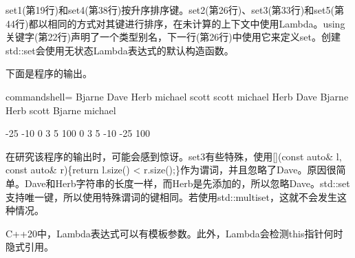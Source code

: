 set1(第19行)和set4(第38行)按升序排序键。set2(第26行)、set3(第33行)和set5(第44行)都以相同的方式对其键进行排序，在未计算的上下文中使用Lambda。using关键字(第22行)声明了一个类型别名，下一行(第26行)中使用它来定义set。创建std::set会使用无状态Lambda表达式的默认构造函数。

下面是程序的输出。

\begin{tcblisting}{commandshell={}}
Bjarne Dave Herb michael scott
scott michael Herb Dave Bjarne
Herb scott Bjarne michael

-25 -10 0 3 5 100
0 3 5 -10 -25 100
\end{tcblisting}

在研究该程序的输出时，可能会感到惊讶。set3有些特殊，使用[](const auto\& l, const auto\& r)\{return l.size() < r.size();\}作为谓词，并且忽略了Dave。原因很简单。Dave和Herb字符串的长度一样，而Herb是先添加的，所以忽略Dave。std::set支持唯一键，所以使用特殊谓词的键相同。若使用std::multiset，这就不会发生这种情况。

\begin{tcolorbox}[breakable,enhanced jigsaw,colback=mygreen!5!white,colframe=mygreen!75!black,title={总结}]
C++20中，Lambda表达式可以有模板参数。此外，Lambda会检测this指针何时隐式引用。
\end{tcolorbox}

\newpage








